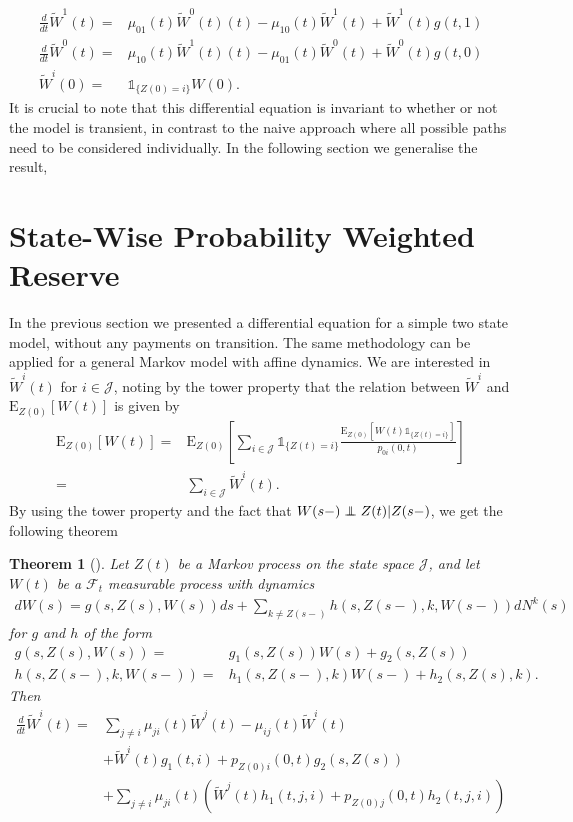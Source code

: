 \documentclass[12pt]{article}
\newcommand{\E}{\text{E}}
\newcommand{\indic}[1]{\mathds{1}_{ \{ #1 \} }}
\newcommand\independent{\protect\mathpalette{\protect\independenT}{\perp}}
\def\independenT#1#2{\mathrel{\rlap{$#1#2$}\mkern2mu{#1#2}}}
\theoremstyle{my_thm}
\newtheorem{thm}{Theorem}[section]
\begin{document}
\begin{align*}
\frac{d}{dt} \tilde{W}^1(t)=& \mu_{01}(t)\tilde{W}^0(t)(t)-\mu_{10}(t)\tilde{W}^1(t)
+ \tilde{W}^1(t)g(t,1)
\\
\frac{d}{dt} \tilde{W}^0(t)=& \mu_{10}(t)\tilde{W}^1(t)(t)-\mu_{01}(t)\tilde{W}^0(t)
+ \tilde{W}^0(t)g(t,0)
\\
\tilde{W}^i(0)=&\indic{Z(0)=i}W(0).
\end{align*}
It is crucial to note that this differential equation is invariant to whether or not the model is transient, in contrast to the naive approach where all possible paths need to be considered individually. In the following section we generalise the result, 

\section{State-Wise Probability Weighted Reserve}
In the previous section we presented a differential equation for a simple two state model, without any payments on transition. The same methodology can be applied for a general Markov model with affine dynamics. We are interested in $\tilde{W}^i(t)$ for $i \in \mathcal{J}$, noting by the tower property that the relation between $\tilde{W}^i$ and $\E_{Z(0)}[W(t)]$ is given by
\begin{align*}
\E_{Z(0)}[W(t)] =&
\E_{Z(0)} \left[ \sum_{i\in \mathcal{J}} \indic{Z(t)=i} \frac{\E_{Z(0)}[W(t)\indic{Z(t)=i}]}{p_{0i}(0,t)} \right]
\\
=&
\sum_{i\in \mathcal{J}} \tilde{W}^i(t).
\end{align*}
By using the tower property and the fact that $W(s-)\independent Z(t)|Z(s-)$, we get the following theorem
\begin{thm}[]
\label{thm:Diff_1}
Let $Z(t)$ be a Markov process on the state space $\mathcal{J}$, and let $W(t)$ be a $\mathcal{F}_t$ measurable process with dynamics
\begin{align*}
dW(s)=  g(s,Z(s),W(s))ds+
 \sum_{k \neq Z(s-)} h(s,Z(s-),k,W(s-)) dN^k(s) 
\end{align*}
for $g$ and $h$ of the form
\begin{align*}
g(s,Z(s),W(s))=&g_1(s,Z(s)) W(s)+g_2(s,Z(s))
\\
h(s,Z(s-),k,W(s-))=&h_1(s,Z(s-),k) W(s-)+h_2(s,Z(s),k).
\end{align*}
Then
\begin{align*}
\frac{d}{dt}\tilde{W}^i(t)=&
\sum_{j \neq i} \mu_{ji}(t) \tilde{W}^j(t)-\mu_{ij}(t)\tilde{W}^i(t)
\\
&+
\tilde{W}^i(t)g_1(t,i)+p_{Z(0)i}(0,t)g_2(s,Z(s))
\\
&+
\sum_{j\neq i} \mu_{ji}(t) \left( \tilde{W}^j(t) h_1(t,j,i)+ p_{Z(0)j}(0,t)h_2(t,j,i)\right)
\end{align*}
\end{thm}
\end{document}
